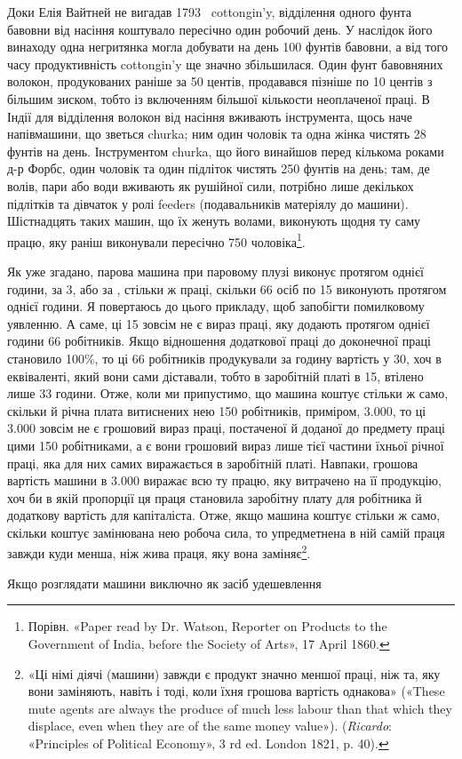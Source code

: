 \parcont{}  %
Доки Елія Вайтней не вигадав 1793~ cottongin’y, відділення одного
фунта бавовни від насіння коштувало пересічно один робочий
день. У наслідок його винаходу одна негритянка могла добувати
на день 100 фунтів бавовни, а від того часу продуктивність cottongin’y
ще значно збільшилася. Один фунт бавовняних волокон,
продукованих раніше за 50 центів, продавався пізніше по
10 центів з більшим зиском, тобто із включенням більшої кількости
неоплаченої праці. В Індії для відділення волокон від насіння
вживають інструмента, щось наче напівмашини, що зветься
churka; ним один чоловік та одна жінка чистять 28 фунтів на день.
Інструментом churka, що його винайшов перед кількома роками д-р Форбс, один
чоловік та один підліток чистять 250 фунтів на
день; там, де волів, пари або води вживають як рушійної сили,
потрібно лише декількох підлітків та дівчаток у ролі feeders
(подавальників матеріялу до машини). Шістнадцять таких машин,
що їх женуть волами, виконують щодня ту саму працю, яку раніш
виконували пересічно 750 чоловіка\footnote{
Порівн. «Paper read by Dr. Watson, Reporter on Products to the
Government of India, before the Society of Arts», 17 April 1860.
}.

Як уже згадано, парова машина при паровому плузі виконує
протягом однієї години, за 3, або за , стільки ж
праці, скільки 66 осіб по 15 виконують протягом однієї
години. Я повертаюсь до цього прикладу, щоб запобігти помилковому
уявленню. А саме, ці 15 зовсім не є вираз праці, яку
додають протягом однієї години 66 робітників. Якщо відношення
додаткової праці до доконечної праці становило 100\%, то ці
66 робітників продукували за годину вартість у 30,
хоч в еквіваленті, який вони сами діставали, тобто в заробітній
платі в 15, втілено лише 33 години. Отже, коли ми припустимо,
що машина коштує стільки ж само, скільки й річна
плата витиснених нею 150 робітників, приміром, \num{3.000}, то ці \num{3.000} зовсім не є грошовий
вираз праці, постаченої й доданої до предмету праці цими 150 робітниками,
а є вони грошовий вираз лише тієї частини їхньої
річної праці, яка для них самих виражається в заробітній платі.
Навпаки, грошова вартість машини в \num{3.000}
виражає всю ту працю, яку витрачено на її продукцію, хоч би
в якій пропорції ця праця становила заробітну плату для
робітника й додаткову вартість для капіталіста. Отже, якщо
машина коштує стільки ж само, скільки коштує замінювана нею
робоча сила, то упредметнена в ній самій праця завжди куди
менша, ніж жива праця, яку вона заміняє\footnote{
«Ці німі діячі (машини) завжди є продукт значно меншої праці,
ніж та, яку вони заміняють, навіть і тоді, коли їхня грошова вартість
однакова» («These mute agents are always the produce of much less labour
than that which they displace, even when they are of the same money
value»). (\emph{Ricardo}: «Principles of Political Economy», 3 rd ed. London
1821, p. 40).
}.

Якщо розглядати машини виключно як засіб удешевлення
\parbreak{}  %
